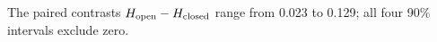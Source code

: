 The paired contrasts $H_{\rm open}-H_{\rm closed}$ range from 0.023 to 0.129; all four 90\% intervals exclude zero.
